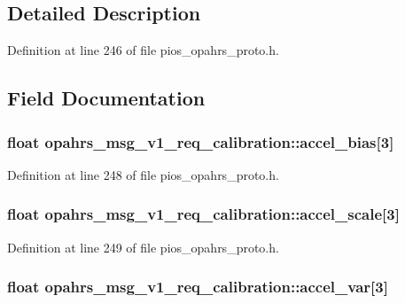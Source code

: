 \subsection{Detailed Description}


Definition at line 246 of file pios\-\_\-opahrs\-\_\-proto.\-h.



\subsection{Field Documentation}
\hypertarget{structopahrs__msg__v1__req__calibration_a860b30e7753b3069861a6a2c64a5ea02}{
\subsubsection[{accel\-\_\-bias}]{\setlength{\rightskip}{0pt plus 5cm}float opahrs\-\_\-msg\-\_\-v1\-\_\-req\-\_\-calibration\-::accel\-\_\-bias\mbox{[}3\mbox{]}}}\label{structopahrs__msg__v1__req__calibration_a860b30e7753b3069861a6a2c64a5ea02}


Definition at line 248 of file pios\-\_\-opahrs\-\_\-proto.\-h.

\hypertarget{structopahrs__msg__v1__req__calibration_a8f5ebd9dc3d4370177ea09618478e44a}{
\subsubsection[{accel\-\_\-scale}]{\setlength{\rightskip}{0pt plus 5cm}float opahrs\-\_\-msg\-\_\-v1\-\_\-req\-\_\-calibration\-::accel\-\_\-scale\mbox{[}3\mbox{]}}}\label{structopahrs__msg__v1__req__calibration_a8f5ebd9dc3d4370177ea09618478e44a}


Definition at line 249 of file pios\-\_\-opahrs\-\_\-proto.\-h.

\hypertarget{structopahrs__msg__v1__req__calibration_a36d6dfc1c8faef08c1e983de4cd36dc0}{
\subsubsection[{accel\-\_\-var}]{\setlength{\rightskip}{0pt plus 5cm}float opahrs\-\_\-msg\-\_\-v1\-\_\-req\-\_\-calibration\-::accel\-\_\-var\mbox{[}3\mbox{]}}}\label{structopahrs__msg__v1__req__calibration_a36d6dfc1c8faef08c1e983de4cd36dc0}


